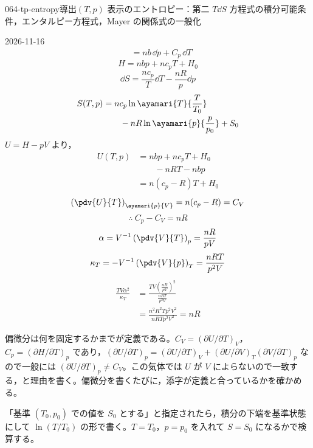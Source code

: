 \documentclass[uplatex,dvipdfmx,a4paper,11pt]{jsarticle}
\begin{document}
\begin{mondai}{064-tp-entropy}{導出}{$(T,p)$ 表示のエントロピー：第二 $T\dd S$ 方程式の積分可能条件，エンタルピー方程式，Mayer の関係式の一般化}
\begin{kotaeutsushi}{2026-11-16}
\begin{align*}
&=nb\,\dd p+C_{p}\,\dd T
\end{align*}
\[ H=nbp+nc_{p}T+H_{0} \]
\[ \dd S=\frac{nc_{p}}{T}\dd T-\frac{nR}{p}\dd p \]
\begin{align*}
S(T,p)&=nc_{p}\ln\ayamari{T}{\frac{T}{T_{0}}}\\
&\qquad-nR\ln\ayamari{p}{\frac{p}{p_{0}}}+S_{0}
\end{align*}
$U=H-pV$ より，
\begin{align*}
U(T,p)&=nbp+nc_{p}T+H_{0}\\
&\qquad-nRT-nbp\\
&=n(c_{p}-R)T+H_{0}
\end{align*}
\[ \left(\pdv{U}{T}\right)_{\ayamari{p}{V}}=n(c_{p}-R)=C_{V} \]
\[ \therefore\ C_{p}-C_{V}=nR \]
\[ \alpha=V^{-1}\left(\pdv{V}{T}\right)_{p}=\frac{nR}{pV} \]
\[ \kappa_{T}=-V^{-1}\left(\pdv{V}{p}\right)_{T}=\frac{nRT}{p^{2}V} \]
\begin{align*}
\frac{TV\alpha^{2}}{\kappa_{T}}&=\frac{TV\left(\frac{nR}{pV}\right)^{2}}{\frac{nRT}{p^{2}V}}\\
&=\frac{n^{2}R^{2}Tp^{2}V^{2}}{nRTp^{2}V^{2}}=nR
\end{align*}
\end{kotaeutsushi}
\begin{kizuki}
\item {} 偏微分は何を固定するかまでが定義である。$C_{V}=(\partial U/\partial T)_{V}$，$C_{p}=(\partial H/\partial T)_{p}$ であり，$(\partial U/\partial T)_{p}=(\partial U/\partial T)_{V}+(\partial U/\partial V)_{T}(\partial V/\partial T)_{p}$ なので一般には $(\partial U/\partial T)_{p}\neq C_{V}$。この気体では $U$ が $V$ によらないので一致する，と理由を書く。偏微分を書くたびに，添字が定義と合っているかを確かめる。
\item 「基準 $(T_{0},p_{0})$ での値を $S_{0}$ とする」と指定されたら，積分の下端を基準状態にして $\ln(T/T_{0})$ の形で書く。$T=T_{0}$，$p=p_{0}$ を入れて $S=S_{0}$ になるかで検算する。

\end{kizuki}
\end{mondai}
\end{document}
